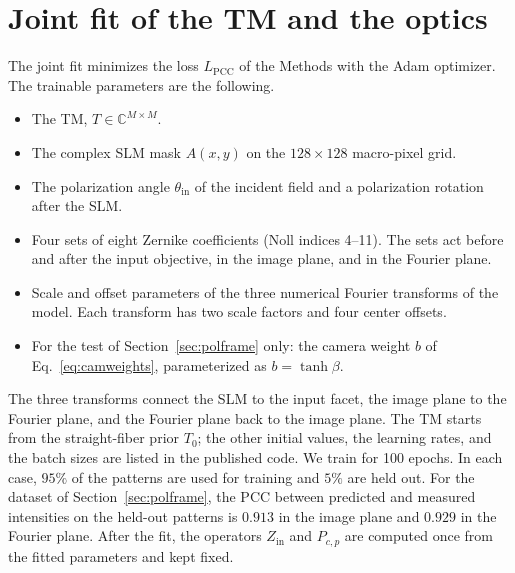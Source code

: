 \documentclass{article}
\begin{document}
\section{Joint fit of the TM and the optics}
\label{sec:jointfit}
The joint fit minimizes the loss $L_{\mathrm{PCC}}$ of the Methods with the Adam optimizer.
The trainable parameters are the following.
\begin{itemize}
\item The TM, $T\in\mathbb{C}^{M\times M}$.
\item The complex SLM mask $A(x,y)$ on the $128\times128$ macro-pixel grid.
\item The polarization angle $\theta_{\mathrm{in}}$ of the incident field and a polarization rotation after the SLM.
\item Four sets of eight Zernike coefficients (Noll indices 4--11). The sets act before and after the input objective, in the image plane, and in the Fourier plane.
\item Scale and offset parameters of the three numerical Fourier transforms of the model. Each transform has two scale factors and four center offsets.
\item For the test of Section~\ref{sec:polframe} only: the camera weight $b$ of Eq.~\eqref{eq:camweights}, parameterized as $b=\tanh\beta$.
\end{itemize}
The three transforms connect the SLM to the input facet, the image plane to the Fourier plane, and the Fourier plane back to the image plane.
The TM starts from the straight-fiber prior $T_0$; the other initial values, the learning rates, and the batch sizes are listed in the published code.
We train for 100 epochs.
In each case, $95\%$ of the patterns are used for training and $5\%$ are held out.
For the dataset of Section~\ref{sec:polframe}, the PCC between predicted and measured intensities on the held-out patterns is $0.913$ in the image plane and $0.929$ in the Fourier plane.
After the fit, the operators $Z_{\mathrm{in}}$ and $P_{c,p}$ are computed once from the fitted parameters and kept fixed.

\end{document}
